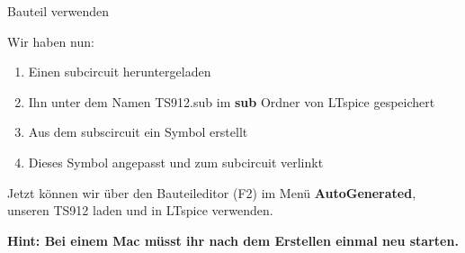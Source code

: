 \begin{frame}[t]{Bauteil verwenden}

    Wir haben nun:

    \begin{enumerate}
        \item Einen subcircuit heruntergeladen
        \item Ihn unter dem Namen TS912.sub im \textbf{sub} Ordner von LTspice gespeichert
        \item Aus dem subscircuit ein Symbol erstellt
        \item Dieses Symbol angepasst und zum subcircuit verlinkt
    \end{enumerate}

    Jetzt können wir über den Bauteileditor (F2) im Menü \textbf{AutoGenerated}, unseren
    TS912 laden und in LTspice verwenden.

    \textbf{Hint: Bei einem Mac müsst ihr nach dem Erstellen einmal neu starten.}

\end{frame}